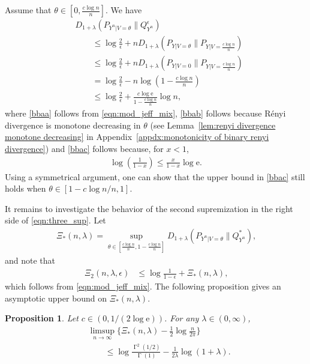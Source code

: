 \documentclass[journal, 10pt]{IEEEtran}
\newcommand{\rme}{\mathrm{e}}
\theoremstyle{plain}
\theoremstyle{plain}
\theoremstyle{plain}
\newtheorem{prop}{Proposition}%
\theoremstyle{plain}
\newcommand{\opGamma}{\operatorname{\Gamma}}
\begin{document}
\begin{IEEEproof}
Assume that $\theta \in \left[ 0,\frac{c\log n}{n}\right]$. We have 
\begin{align}
&D_{1+\lambda }\left( P_{Y^n|V=\theta} \| Q_{Y^n}^{\epsilon}\right) \nonumber \\
&\qquad \le 
\log \frac{2}{\epsilon} +nD_{1+\lambda }\left( P_{Y|V=\theta}\|P_{Y | V=\frac{c\log n}{n}} \right)
 \label{bbaa}\\
&\qquad  \le
\log \frac{2}{\epsilon} +nD_{1+\lambda }\left( P_{Y|V=0}\|P_{Y | V=\frac{c\log n}{n}} \right) \label{bbab} \\
&\qquad =
\log \frac{2}{\epsilon} -n\log \left( 1-\tfrac{c\log n}{n} \right) \\
&\qquad  \le
\log \frac{2}{\epsilon} +\frac{c\log \rme}{1-\frac{c\log n}{n}} \log n \text{,} \label{bbac}
\end{align}
where \eqref{bbaa} follows from \eqref{eqn:mod_jeff_mix}, \eqref{bbab} follows because R\'enyi divergence is monotone decreasing in $\theta$ (see Lemma~\ref{lem:renyi divergence monotone decreasing} in Appendix~\ref{appdx:monotonicity of binary renyi divergence}) and \eqref{bbac} follows because, for $x<1 $, 
\begin{align}
\log\left( \frac{1}{1-x} \right) \le \frac{x}{1-x} \log \rme\text{.}
\end{align}
Using a symmetrical argument, one can show that the upper bound in \eqref{bbac} still holds when $\theta \in \left[ 1-{c\log n}/{n}, 1\right]$.
\end{IEEEproof} 
It remains to investigate the behavior of the second supremization in the right side of \eqref{eqn:three_sup}. Let
\begin{align}
\Xi_{\ast}(n, \lambda) = \sup_{\theta \in \left[ \frac{c\log n}{n}, 1-\frac{c\log n}{n} \right]} D_{1+\lambda }( P_{Y^n|V=\theta} \| Q_{Y^n}^{\ast}) \text{,}
\end{align}
and note that
\begin{align}
\Xi_2(n,\lambda, \epsilon)
&\le  
\log \frac{1}{1-\epsilon}+\Xi_{\ast}(n, \lambda)  \text{,} \label{bcaa}
\end{align}
which follows from \eqref{eqn:mod_jeff_mix}. The following proposition gives an asymptotic upper bound on $\Xi_{\ast}(n, \lambda)$.
\begin{prop} \label{prop:achievability-k=2-hard-step}
Let $c \in (0, 1/(2\log \rme))$. For any $ \lambda \in (0,\infty) $,
\begin{align}
&\limsup_{n \to \infty} \Bigg\{ \Xi_{\ast}(n, \lambda)-\frac{1}{2}\log \frac{n}{2\pi} \Bigg\} \nonumber \\ 
&\qquad  \le \log \frac{\opGamma^2(1/2)}{\opGamma(1)}-\frac{1}{2\lambda}\log (1+\lambda)\text{.}
\end{align}
\end{prop}
\end{document}
